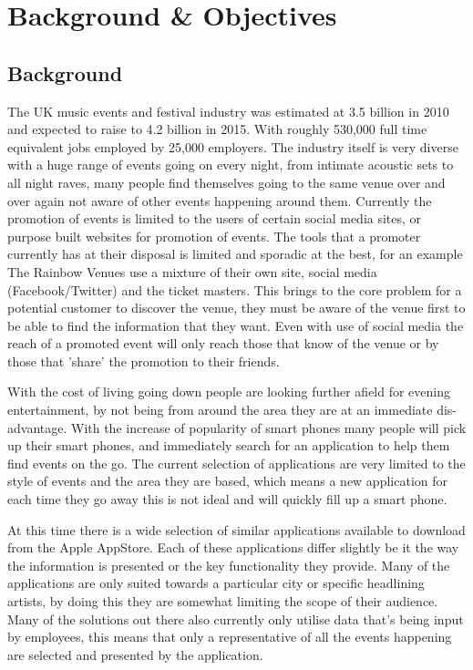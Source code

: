 \chapter{Background \& Objectives}

\section{Background}

	The UK music events and festival industry was estimated at 3.5 billion in 2010 and expected to raise to 4.2 billion in 2015. With roughly 530,000 full time equivalent jobs employed by 25,000 employers.\cite{eventStats} The industry itself is very diverse with a huge range of events going on every night, from intimate acoustic sets to all night  raves, many people find themselves going to the same venue over and over again not aware of other events happening around them. Currently the promotion of events is limited to the users of certain social media sites, or purpose built websites for promotion of events. The tools that a promoter currently has at their disposal is limited and sporadic at the best, for an example The Rainbow Venues\cite{theRainbow} use a mixture of their own site, social media (Facebook/Twitter) and the ticket masters. This brings to the core problem for a potential customer to discover the venue, they must be aware of the venue first to be able to find the information that they want. Even with use of social media the reach of a promoted event will only reach those that know of the venue or by those that 'share' the promotion to their friends. 

	With the cost of living going down people are looking further afield for evening entertainment, by not being from around the area they are at an immediate dis-advantage. With the increase of popularity of smart phones many people will pick up their smart phones, and immediately search for an application to help them find events on the go. The current selection of applications are very limited to the style of events and the area they are based, which means a new application for each time they go away this is not ideal and will quickly fill up a smart phone. 

	At this time there is a wide selection of similar applications available to download from the Apple AppStore. Each of these applications differ slightly be it the way the information is presented or the key functionality they provide. Many of the applications are only suited towards a particular city or specific headlining artists, by doing this they are somewhat limiting the scope of their audience. Many of the solutions out there also currently only utilise data that's being input by employees, this means that only a representative of all the events happening are selected and presented by the application. 

